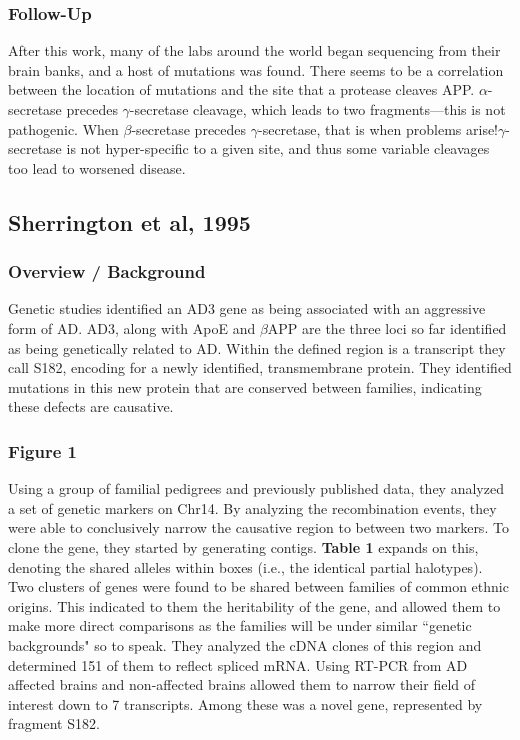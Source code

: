 \documentclass[12pt]{report}
\begin{document}
\subsubsection*{Follow-Up}

After this work, many of the labs around the world began sequencing from their brain banks, and a host of mutations was found. There seems to be a correlation between the location of mutations and the site that a protease cleaves APP. $\alpha$-secretase precedes $\gamma$-secretase cleavage, which leads to two fragments---this is not pathogenic. When $\beta$-secretase precedes $\gamma$-secretase, that is when problems arise!$ \gamma$-secretase is not hyper-specific to a given site, and thus some variable cleavages too lead to worsened disease. 


\subsection*{Sherrington et al, 1995}

\subsubsection*{Overview / Background}



Genetic studies identified an AD3 gene as being associated with an aggressive form of AD. AD3, along with ApoE and $\beta$APP are the three loci so far identified as being genetically related to AD. Within the defined region is a transcript they call S182, encoding for a newly identified, transmembrane protein. They identified mutations in this new protein that are conserved between families, indicating these defects are causative. 

\subsubsection*{Figure 1} Using a group of familial pedigrees and previously published data, they analyzed a set of genetic markers on Chr14. By analyzing the recombination events, they were able to conclusively narrow the causative region to between two markers. To clone the gene, they started by generating contigs. \textbf{Table 1} expands on this, denoting the shared alleles within boxes (i.e., the identical partial halotypes). Two clusters of genes were found to be shared between families of common ethnic origins. This indicated to them the heritability of the gene, and allowed them to make more direct comparisons as the families will be under similar ``genetic backgrounds" so to speak. They analyzed the cDNA clones of this region and determined 151 of them to reflect spliced mRNA. Using RT-PCR from AD affected brains and non-affected brains allowed them to narrow their field of interest down to 7 transcripts. Among these was a novel gene, represented by fragment S182. 
\end{document}
